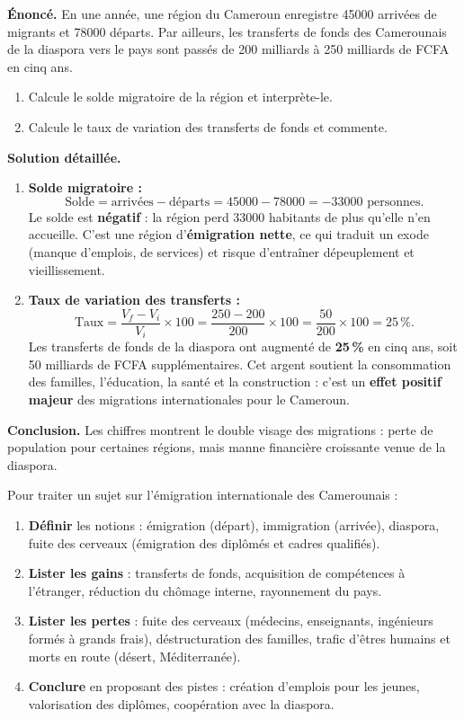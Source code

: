 \documentclass[11pt]{article}
\newcommand{\cle}[1]{{\popxbold\color{popdark}#1}}
\begin{document}
\begin{exoresolu}
\textbf{Énoncé.} En une année, une région du Cameroun enregistre \num{45000} arrivées de migrants et \num{78000} départs. Par ailleurs, les transferts de fonds des Camerounais de la diaspora vers le pays sont passés de 200 milliards à 250 milliards de FCFA en cinq ans.
\begin{enumerate}
\item Calcule le solde migratoire de la région et interprète-le.
\item Calcule le taux de variation des transferts de fonds et commente.
\end{enumerate}
\tcblower
\textbf{Solution détaillée.}
\begin{enumerate}
\item \textbf{Solde migratoire :}
\[ \text{Solde} = \text{arrivées} - \text{départs} = \num{45000} - \num{78000} = -\num{33000} \text{ personnes.} \]
Le solde est \textbf{négatif} : la région perd \num{33000} habitants de plus qu'elle n'en accueille. C'est une région d'\textbf{émigration nette}, ce qui traduit un exode (manque d'emplois, de services) et risque d'entraîner dépeuplement et vieillissement.
\item \textbf{Taux de variation des transferts :}
\[ \text{Taux} = \dfrac{V_f - V_i}{V_i} \times 100 = \dfrac{250 - 200}{200} \times 100 = \dfrac{50}{200} \times 100 = 25\,\%. \]
Les transferts de fonds de la diaspora ont augmenté de \textbf{25\,\%} en cinq ans, soit 50 milliards de FCFA supplémentaires. Cet argent soutient la consommation des familles, l'éducation, la santé et la construction : c'est un \textbf{effet positif majeur} des migrations internationales pour le Cameroun.
\end{enumerate}
\textbf{Conclusion.} Les chiffres montrent le double visage des migrations : perte de population pour certaines régions, mais manne financière croissante venue de la diaspora.
\end{exoresolu}

\begin{methode}
Pour traiter un sujet sur l'émigration internationale des Camerounais :
\begin{enumerate}
\item \textbf{Définir} les notions : \cle{émigration} (départ), \cle{immigration} (arrivée), \cle{diaspora}, \cle{fuite des cerveaux} (émigration des diplômés et cadres qualifiés).
\item \textbf{Lister les gains} : transferts de fonds, acquisition de compétences à l'étranger, réduction du chômage interne, rayonnement du pays.
\item \textbf{Lister les pertes} : fuite des cerveaux (médecins, enseignants, ingénieurs formés à grands frais), déstructuration des familles, trafic d'êtres humains et morts en route (désert, Méditerranée).
\item \textbf{Conclure} en proposant des pistes : création d'emplois pour les jeunes, valorisation des diplômes, coopération avec la diaspora.
\end{enumerate}
\end{methode}
\end{document}
